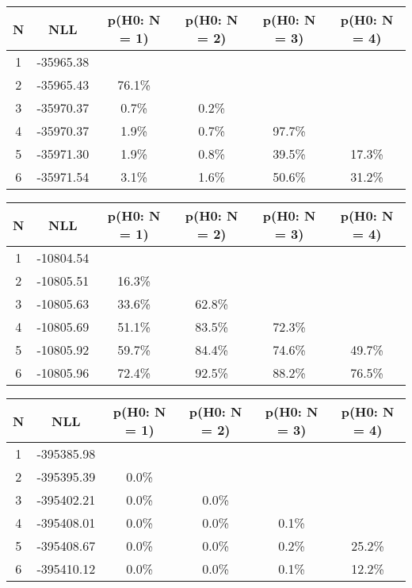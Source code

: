 \begin{table}[htb]
	\begin{center}
{\footnotesize\renewcommand{\arraystretch}{1.4}
		\begin{tabular}{cc||cccc}
			N & NLL & p(H0: N = 1) & p(H0: N = 2) & p(H0: N = 3) & p(H0: N = 4)\\ 
		\hline
1 & -35965.38 & & & & \\
2 & -35965.43 & 76.1\% & & & \\
3 & -35970.37 & 0.7\% & 0.2\% & & \\
4 & -35970.37 & 1.9\% & 0.7\% & 97.7\% & \\
5 & -35971.30 & 1.9\% & 0.8\% & 39.5\% & 17.3\% \\
6 & -35971.54 & 3.1\% & 1.6\% & 50.6\% & 31.2\% \\
	\end{tabular}
		\label{tab:lab}
	}
	\end{center}\end{table}

\begin{table}[htb]
	\begin{center}
{\footnotesize\renewcommand{\arraystretch}{1.4}
		\begin{tabular}{cc||cccc}
			N & NLL & p(H0: N = 1) & p(H0: N = 2) & p(H0: N = 3) & p(H0: N = 4)\\ 
		\hline
1 & -10804.54 & & & & \\
2 & -10805.51 & 16.3\% & & & \\
3 & -10805.63 & 33.6\% & 62.8\% & & \\
4 & -10805.69 & 51.1\% & 83.5\% & 72.3\% & \\
5 & -10805.92 & 59.7\% & 84.4\% & 74.6\% & 49.7\% \\
6 & -10805.96 & 72.4\% & 92.5\% & 88.2\% & 76.5\% \\
	\end{tabular}
		\label{tab:lab}
	}
	\end{center}\end{table}

\begin{table}[htb]
	\begin{center}
{\footnotesize\renewcommand{\arraystretch}{1.4}
		\begin{tabular}{cc||cccc}
			N & NLL & p(H0: N = 1) & p(H0: N = 2) & p(H0: N = 3) & p(H0: N = 4)\\ 
		\hline
1 & -395385.98 & & & & \\
2 & -395395.39 & 0.0\% & & & \\
3 & -395402.21 & 0.0\% & 0.0\% & & \\
4 & -395408.01 & 0.0\% & 0.0\% & 0.1\% & \\
5 & -395408.67 & 0.0\% & 0.0\% & 0.2\% & 25.2\% \\
6 & -395410.12 & 0.0\% & 0.0\% & 0.1\% & 12.2\% \\
	\end{tabular}
		\label{tab:lab}
	}
	\end{center}\end{table}

